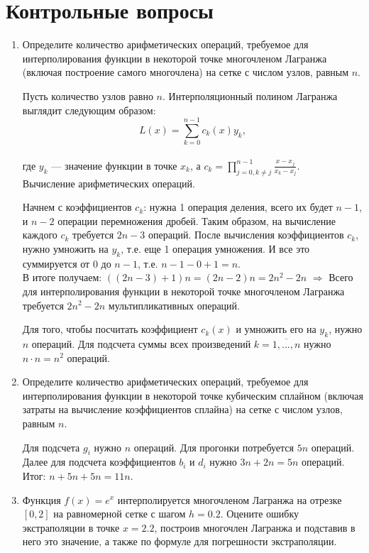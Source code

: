 \documentclass[12pt, a4paper]{article}
\begin{document}
\pagebreak

\section{Контрольные вопросы}
\begin{enumerate}

\item Определите количество арифметических операций, требуемое для интерполирования функции в некоторой точке многочленом Лагранжа (включая построение самого многочлена) на сетке с числом узлов, равным $n$.

Пусть количество узлов равно $n$. Интерполяционный полином Лагранжа выглядит следующим образом:\\
$$L(x)=\sum \limits_{k=0}^{n-1} c_k(x) y_k,$$\\ где $y_k$ --- значение функции в точке $x_k$, а $c_k = \prod \limits_{j=0,k\neq j }^{n-1}\frac{x-x_j}{x_k-x_j}.$\\
Вычисление арифметических операций.

Начнем с коэффициентов $c_k$: нужна 1 операция деления, всего их будет $n-1$, и $n-2$ операции перемножения дробей. Таким образом, на вычисление каждого $c_k$ требуется $2n-3$ операций. После вычисления коэффициентов $c_k$, нужно умножить на $y_k$, т.е. еще 1 операция умножения. И все это суммируется от $0$ до $n-1$, т.е. $n-1-0+1=n$.\\
В итоге получаем: $((2n-3)+1)n = (2 n -2)n=2n^2-2n$ $\Rightarrow$ Всего для интерполирования функции в некоторой точке многочленом Лагранжа требуется $2n^2-2n$ мультипликативных операций.


Для того, чтобы посчитать коэффициент $c_k(x)$ и умножить его на $y_k$, нужно $n$ операций. Для подсчета суммы всех произведений $k = \overline{1,..., n}$ нужно $n \cdot n = n^2$ операций.

\item Определите количество арифметических операций, требуемое для интерполирования функции в некоторой точке кубическим сплайном (включая затраты на вычисление коэффициентов сплайна) на сетке с числом узлов, равным $n$.

Для подсчета $g_i$ нужно $n$ операций. Для прогонки потребуется $5n$ операций. Далее для подсчета коэффициентов $b_i$ и $d_i$ нужно $3n + 2n = 5n$ операций. Итог: $n + 5n + 5n = 11n$.

\pagebreak

\item Функция $f(x) = e^x$ интерполируется многочленом Лагранжа на отрезке $[0, 2]$ на равномерной сетке с шагом $h = 0{.}2$. Оцените ошибку экстраполяции в точке $x = 2{.}2$, построив многочлен Лагранжа и подставив в него это значение, а также по формуле для погрешности экстраполяции.


\end{enumerate}
\end{document}
